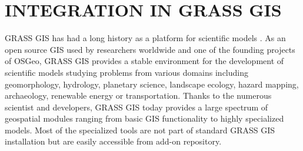 \documentclass{isprs}
\begin{document}
\section{INTEGRATION IN GRASS GIS}
GRASS GIS has had a long history as a platform for scientific models \cite{chemin2015grass}.
As an open source GIS used by researchers worldwide and one of the founding projects of OSGeo,
GRASS GIS provides a stable environment for the development of
scientific models studying problems from various domains
including geomorphology, hydrology, planetary science, landscape ecology, hazard mapping, archaeology, renewable energy 
or transportation.
Thanks to the numerous scientist and developers, GRASS GIS today provides a large spectrum of geospatial modules
ranging from basic GIS functionality to highly specialized models.
Most of the specialized tools are not part of standard GRASS GIS installation
but are easily accessible from add-on repository.
\end{document}
